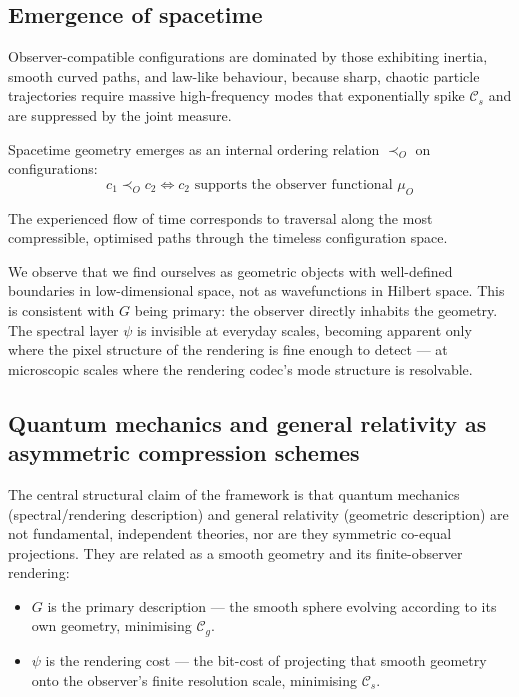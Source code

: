 \documentclass[12pt,a4paper]{article}
\newcommand{\Cs}{\mathcal{C}_s}
\newcommand{\Cg}{\mathcal{C}_g}
\newcommand{\muO}{\mu_O}
\begin{document}
\subsection*{Emergence of spacetime}

Observer-compatible configurations are dominated by those exhibiting inertia,
smooth curved paths, and law-like behaviour, because sharp, chaotic particle
trajectories require massive high-frequency modes that exponentially spike
$\Cs$ and are suppressed by the joint measure.

Spacetime geometry emerges as an internal ordering relation $\prec_O$ on
configurations:
\begin{equation}
c_1 \prec_O c_2 \iff c_2 \text{ supports the observer functional } \muO
\end{equation}

The experienced flow of time corresponds to traversal along the most
compressible, optimised paths through the timeless configuration space.

We observe that we find ourselves as geometric objects with well-defined
boundaries in low-dimensional space, not as wavefunctions in Hilbert space.
This is consistent with $G$ being primary: the observer directly inhabits the
geometry. The spectral layer $\psi$ is invisible at everyday scales, becoming
apparent only where the pixel structure of the rendering is fine enough to
detect --- at microscopic scales where the rendering codec's mode structure
is resolvable.

\subsection*{Quantum mechanics and general relativity as asymmetric compression
schemes}

The central structural claim of the framework is that quantum mechanics
(spectral/rendering description) and general relativity (geometric description)
are not fundamental, independent theories, nor are they symmetric co-equal
projections. They are related as a smooth geometry and its finite-observer
rendering:

\begin{itemize}
  \item $G$ is the primary description --- the smooth sphere evolving
        according to its own geometry, minimising $\Cg$.
  \item $\psi$ is the rendering cost --- the bit-cost of projecting that
        smooth geometry onto the observer's finite resolution scale,
        minimising $\Cs$.
\end{itemize}
\end{document}
